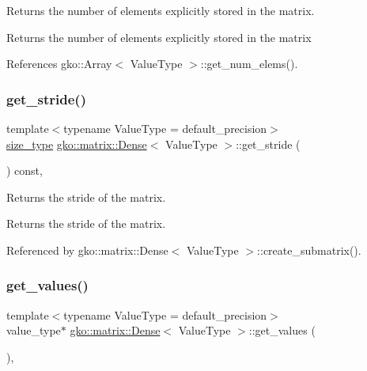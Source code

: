 Returns the number of elements explicitly stored in the matrix. 

\begin{DoxyReturn}{Returns}
the number of elements explicitly stored in the matrix 
\end{DoxyReturn}


References gko\+::\+Array$<$ Value\+Type $>$\+::get\+\_\+num\+\_\+elems().

\mbox{\label{classgko_1_1matrix_1_1Dense_a8c1b220b9b9292893d9be22d632a9a0e}} 
\subsubsection{\texorpdfstring{get\+\_\+stride()}{get\_stride()}}
{\footnotesize\ttfamily template$<$typename Value\+Type = default\+\_\+precision$>$ \\
\hyperlink{namespacegko_a6e5c95df0ae4e47aab2f604a22d98ee7}{size\+\_\+type} \hyperlink{classgko_1_1matrix_1_1Dense}{gko\+::matrix\+::\+Dense}$<$ Value\+Type $>$\+::get\+\_\+stride (\begin{DoxyParamCaption}{ }\end{DoxyParamCaption}) const\hspace{0.3cm}{\ttfamily [inline]}, {\ttfamily [noexcept]}}



Returns the stride of the matrix. 

\begin{DoxyReturn}{Returns}
the stride of the matrix. 
\end{DoxyReturn}


Referenced by gko\+::matrix\+::\+Dense$<$ Value\+Type $>$\+::create\+\_\+submatrix().

\mbox{\label{classgko_1_1matrix_1_1Dense_a3bc458e02fab8e4c9f60f70bd4d5a4f9}} 
\subsubsection{\texorpdfstring{get\+\_\+values()}{get\_values()}}
{\footnotesize\ttfamily template$<$typename Value\+Type = default\+\_\+precision$>$ \\
value\+\_\+type$\ast$ \hyperlink{classgko_1_1matrix_1_1Dense}{gko\+::matrix\+::\+Dense}$<$ Value\+Type $>$\+::get\+\_\+values (\begin{DoxyParamCaption}{ }\end{DoxyParamCaption})\hspace{0.3cm}{\ttfamily [inline]}, {\ttfamily [noexcept]}}



